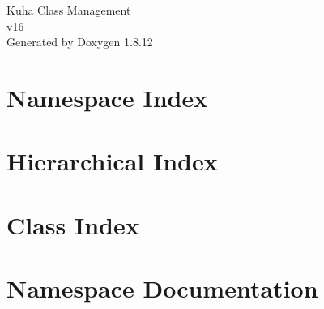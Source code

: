 \documentclass[twoside]{book}
\newcommand{\+}{\discretionary{\mbox{\scriptsize$\hookleftarrow$}}{}{}}
\newcommand{\clearemptydoublepage}{%
  \newpage{\pagestyle{empty}\cleardoublepage}%
}
\begin{document}
\hypersetup{pageanchor=false,
             bookmarksnumbered=true,
             pdfencoding=unicode
            }
\begin{titlepage}
\vspace*{7cm}
\begin{center}%
{\Large Kuha Class Management \\[1ex]\large v16 }\\
\vspace*{1cm}
{\large Generated by Doxygen 1.8.12}\\
\end{center}
\end{titlepage}
\clearemptydoublepage
{}
\tableofcontents
\clearemptydoublepage
{}
\hypersetup{pageanchor=true}

\chapter{Namespace Index}

\chapter{Hierarchical Index}

\chapter{Class Index}

\chapter{Namespace Documentation}




\end{document}
